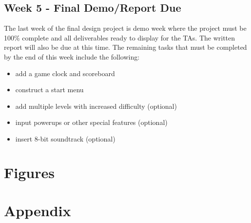 \documentclass[journal, twocolumn, final,11pt,letterpaper]{IEEEtran}
\begin{document}
\subsection{Week 5 - Final Demo/Report Due}  
The last week of the final design project is demo week where the project must be 100\% complete and all deliverables ready to display for the TAs.  The written report will also be due at this time.  The remaining tasks that must be completed by the end of this week include the following:   

\begin{itemize}
	\item add a game clock and scoreboard
	\item construct a start menu
	\item add multiple levels with increased difficulty (optional)
	\item input powerups or other special features (optional)
	\item insert 8-bit soundtrack (optional)  
\end{itemize}


\clearpage
\onecolumn
\section{Figures}



     

\section*{Appendix}
%
\end{document}

